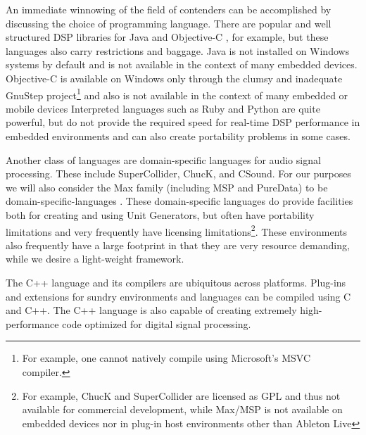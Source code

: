 \documentclass[twoside,10pt]{article}
\begin{document}
An immediate winnowing of the field of contenders can be accomplished by discussing the choice of programming language.  There are popular and well structured DSP libraries for Java \cite{Guillemard:2005, Burk:1998} and Objective-C \cite{Jaffe:1989,Jaffe:1991}, for example, but these languages also carry restrictions and baggage.  Java is not installed on Windows systems by default and is not available in the context of many embedded devices.  Objective-C is available on Windows only through the clumsy and inadequate GnuStep project\footnote{For example, one cannot natively compile using Microsoft's MSVC compiler.} \cite{web3} and also is not available in the context of many embedded or mobile devices
Interpreted languages such as Ruby and Python are quite powerful, but do not provide the required speed for real-time DSP performance in embedded environments and can also create portability problems in some cases. 

Another class of languages are domain-specific languages for audio signal processing.  These include SuperCollider\cite{McCartney:1996}, ChucK\cite{wang:2008}, and CSound.  For our purposes we will also consider the Max family (including MSP\cite{Zicarelli:1998} and PureData\cite{Puckette:1996}) to be domain-specific-languages
.  
These domain-specific languages do provide facilities both for creating and using Unit Generators, but often have portability limitations and very frequently have licensing limitations\footnote{For example, ChucK and SuperCollider are licensed as GPL and thus not available for commercial development, while Max/MSP is not available on embedded devices nor in plug-in host environments other than Ableton Live}.  These environments also frequently have a large footprint in that they are very resource demanding, while we desire a light-weight framework.

The C++ language and its compilers are ubiquitous across platforms.  Plug-ins and extensions for sundry environments and languages can be compiled using C and C++.  The C++ language is also capable of creating extremely high-performance code optimized for digital signal processing.
\end{document}
